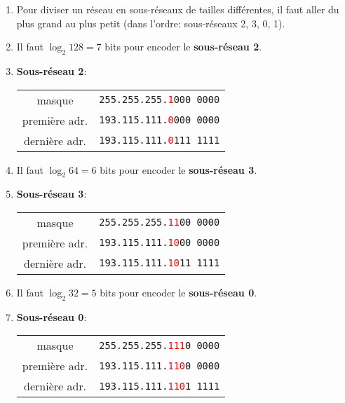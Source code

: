\documentclass[a4paper]{article}
\begin{document}
\begin{itemize}
    
    \begin{example}
    \begin{enumerate}
        \item Pour diviser un réseau en sous-réseaux de tailles différentes, il faut aller du plus grand au plus petit (dans l'ordre: sous-réseaux 2, 3, 0, 1).
        \item Il faut $ \log_2 128 = 7 $ bits pour encoder le \textbf{sous-réseau 2}.
        \item \textbf{Sous-réseau 2}:
        \begin{center}
            \begin{tabular}{cc}
                masque & \texttt{255.255.255.\textcolor{red}{1}000 0000} \\
                première adr. & \texttt{193.115.111.\textcolor{red}{0}000 0000} \\
                dernière adr. & \texttt{193.115.111.\textcolor{red}{0}111 1111} \\
            \end{tabular}
        \end{center}
        \item Il faut $ \log_2 64 = 6 $ bits pour encoder le \textbf{sous-réseau 3}.
        \item \textbf{Sous-réseau 3}:
        \begin{center}
            \begin{tabular}{cc}
                masque & \texttt{255.255.255.\textcolor{red}{11}00 0000} \\
                première adr. & \texttt{193.115.111.\textcolor{red}{10}00 0000} \\
                dernière adr. & \texttt{193.115.111.\textcolor{red}{10}11 1111} \\
            \end{tabular}
        \end{center}
        \item Il faut $ \log_2 32 = 5 $ bits pour encoder le \textbf{sous-réseau 0}.
        \item \textbf{Sous-réseau 0}:
        \begin{center}
            \begin{tabular}{cc}
                masque & \texttt{255.255.255.\textcolor{red}{111}0 0000} \\
                première adr. & \texttt{193.115.111.\textcolor{red}{110}0 0000} \\
                dernière adr. & \texttt{193.115.111.\textcolor{red}{110}1 1111} \\

\end{tabular}
\end{center}
\end{enumerate}
\end{example}
\end{itemize}
\end{document}
